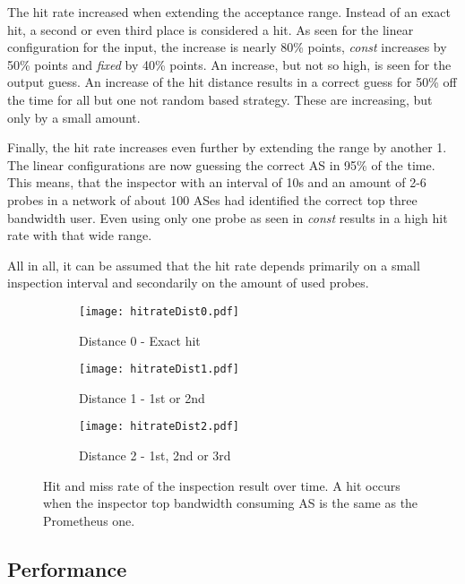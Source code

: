 \documentclass[thesis.tex]{subfiles}
\begin{document}
The hit rate increased when extending the acceptance range. Instead of an exact hit, a second or even third place is considered a hit. As seen for the linear configuration for the input, the increase is nearly 80\% points, \textit{const} increases by 50\% points and \textit{fixed} by 40\% points. An increase, but not so high, is seen for the output guess. An increase of the hit distance results in a correct guess for 50\% off the time for all but one not random based strategy. These are increasing, but only by a small amount.

Finally, the hit rate increases even further by extending the range by another 1. The linear configurations are now guessing the correct AS in 95\% of the time. This means, that the inspector with an interval of 10s and an amount of 2-6 probes in a network of about 100 ASes had identified the correct top three bandwidth user. Even using only one probe as seen in \textit{const} results in a high hit rate with that wide range.

All in all, it can be assumed that the hit rate depends primarily on a small inspection interval and secondarily on the amount of used probes.
\begin{figure}
	\centering
	\begin{subfigure}{0.8\linewidth}
		\centering
		\texttt{[image: hitrateDist0.pdf]}
		\caption{Distance 0 - Exact hit}
		\label{fig:eva:hitrate:0}
	\end{subfigure}
	\hfill
	\begin{subfigure}{0.8\linewidth}
		\centering
		\texttt{[image: hitrateDist1.pdf]}
		\caption{Distance 1 - 1st or 2nd}
		\label{fig:eva:hitrate:1}
	\end{subfigure}
	\hfill	
	\begin{subfigure}{0.8\linewidth}
		\centering
		\texttt{[image: hitrateDist2.pdf]}
		\caption{Distance 2 - 1st, 2nd or 3rd}
		\label{fig:eva:hitrate:2}
	\end{subfigure}
	\caption{Hit and miss rate of the inspection result over time. A hit occurs when the inspector top bandwidth consuming AS is the same as the Prometheus one.}
	\label{fig:eva:hitrate}
\end{figure}


\subsection{Performance} \label{sec:eva:performance}
\end{document}
